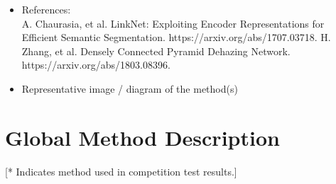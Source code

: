 \documentclass[12pt]{article}
\begin{document}
\begin{itemize}
\item References: \\
A. Chaurasia, et al. LinkNet: Exploiting Encoder Representations for Efficient Semantic Segmentation. https://arxiv.org/abs/1707.03718.  
H. Zhang, et al. Densely Connected Pyramid Dehazing Network. https://arxiv.org/abs/1803.08396. \\ 
\item Representative image / diagram of the method(s)             
\end{itemize}

\section{Global Method Description}
[* Indicates method used in competition test results.]
\end{document}
